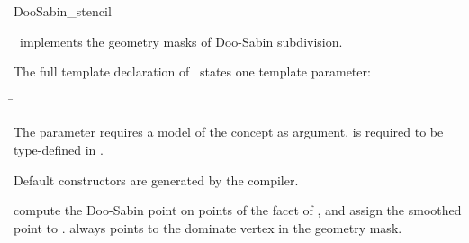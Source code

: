 \begin{ccRefClass}{DooSabin_stencil}

\ccDefinition

\ccClassTemplateName\ implements the geometry masks of 
Doo-Sabin subdivision. 


\ccParameters

The full template declaration of \ccClassTemplateName\ states one
template parameter:

\begin{tabbing}
 \= 
\end{tabbing}
   
The  parameter requires a model of 
the  concept as argument. 
 is required to be type-defined in .

\ccCreation

Default constructors are generated by the compiler.

\ccThree{}{}{}

{compute the Doo-Sabin point on points of the facet of , 
and assign the smoothed point to .  always 
points to the dominate vertex in the geometry mask.}


\ccSeeAlso

\\
\\

\end{ccRefClass}

\ccRefPageEnd


